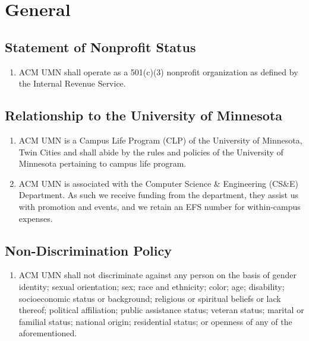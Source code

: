



\section{General}



\subsection{Statement of Nonprofit Status}
\begin{enumerate}
	\item ACM UMN shall operate as a 501(c)(3) nonprofit organization as defined by the Internal Revenue Service.
\end{enumerate}

\subsection{Relationship to the University of Minnesota}
\begin{enumerate}
	\item ACM UMN is a Campus Life Program (CLP) of the University of Minnesota, Twin Cities and shall abide by the rules and policies of the University of Minnesota pertaining to campus life program.
	\item ACM UMN is associated with the Computer Science \& Engineering (CS\&E) Department. As such we receive funding from the department, they assist us with promotion and events, and we retain an EFS number for within-campus expenses.
\end{enumerate}

\subsection{Non-Discrimination Policy}
\begin{enumerate}
	\item ACM UMN shall not discriminate against any person on the basis of gender identity; sexual orientation; sex; race and ethnicity; color; age; disability; socioeconomic status or background; religious or spiritual beliefs or lack thereof; political affiliation; public assistance status; veteran status; marital or familial status; national origin; residential status; or openness of any of the aforementioned.
\end{enumerate}

